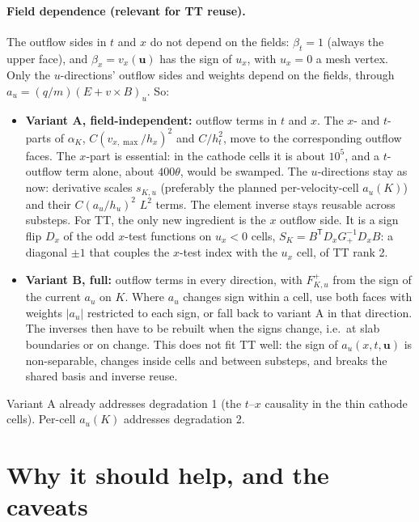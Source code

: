 \documentclass[11pt]{article}
\theoremstyle{remark}
\newcommand{\T}{\mathsf{T}}
\begin{document}
\paragraph{Field dependence (relevant for TT reuse).}  The outflow sides in $t$ and $x$ do not depend on the fields:
$\beta_t=1$ (always the upper face), and $\beta_x=v_x(\mathbf u)$ has the sign of $u_x$, with $u_x=0$ a mesh vertex.
Only the $u$-directions' outflow sides and weights depend on the fields, through $a_u=(q/m)(E+v\times B)_u$.  So:
\begin{itemize}[nosep]
  \item \textbf{Variant A, field-independent:} outflow terms in $t$ and $x$.  The $x$- and $t$-parts of $\alpha_K$,
        $C(v_{x,\max}/h_x)^2$ and $C/h_t^2$, move to the corresponding outflow faces.  The $x$-part is essential: in the
        cathode cells it is about $10^5$, and a $t$-outflow term alone, about $400\theta$, would be swamped.  The
        $u$-directions stay as now: derivative scales $s_{K,u}$ (preferably the planned per-velocity-cell $a_u(K)$) and
        their $C(a_u/h_u)^2$ $L^2$ terms.  The element inverse stays reusable across substeps.  For TT, the only new
        ingredient is the $x$ outflow side.  It is a sign flip $D_x$ of the odd $x$-test functions on $u_x<0$ cells,
        $S_K=B^\T D_xG_+^{-1}D_xB$: a diagonal $\pm1$ that couples the $x$-test index with the $u_x$ cell, of TT rank 2.
  \item \textbf{Variant B, full:} outflow terms in every direction, with $F^+_{K,u}$ from the sign of the current
        $a_u$ on $K$.  Where $a_u$ changes sign within a cell, use both faces with weights $|a_u|$ restricted to each
        sign, or fall back to variant A in that direction.  The inverses then have to be rebuilt when the signs
        change, i.e.\ at slab boundaries or on change.  This does not fit TT well: the sign of $a_u(x,t,\mathbf u)$ is
        non-separable, changes inside cells and between substeps, and breaks the shared basis and inverse reuse.
\end{itemize}
Variant A already addresses degradation 1 (the $t$--$x$ causality in the thin cathode cells).  Per-cell $a_u(K)$
addresses degradation 2.

\section{Why it should help, and the caveats}
\end{document}
